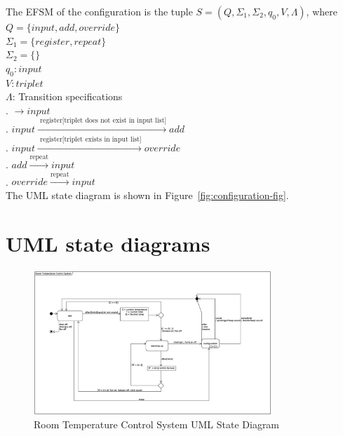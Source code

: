 \documentclass[12pt]{article}
\begin{document}
\begin{spacing}{1.5}
\noindent The EFSM of the configuration is the tuple $S = (Q, \Sigma_1, \Sigma_2, q_0, V, \Lambda)$, where\\
\noindent $Q = \{input, add, override\}$\\
\noindent $\Sigma_1 = \{register, repeat\}$\\
\noindent $\Sigma_2 = \{\}$\\
\noindent $q_0: input$\\
\noindent $V: triplet$\\
\noindent $\Lambda$: Transition specifications\\
. $\rightarrow input$\\
. $input \xrightarrow {\text { register[triplet does not exist in input list]}} add$\\
. $input \xrightarrow {\text { register[triplet exists in input list]}} override$\\
. $add \xrightarrow {\text {repeat}} input$\\
. $override \xrightarrow {\text {repeat}} input$\\

\noindent The UML state diagram is shown in Figure~\ref{fig:configuration-fig}.

\newpage

\section{UML state diagrams}

\begin{figure}[h!]
	\centering
		\includegraphics[width=0.8\textwidth]{./figures/eps/SystemEFSM.eps}
		  \caption{Room Temperature Control System UML State Diagram}
  \label{fig:system-fig}
\end{figure}


\end{spacing}
\end{document}
